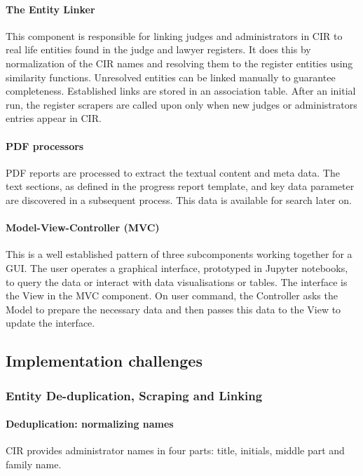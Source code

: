 \paragraph{The Entity Linker} This component is responsible for linking judges and administrators in CIR to real life entities found in the judge and lawyer registers. It does this by normalization of the CIR names and resolving them to the register entities using similarity functions. Unresolved entities can be linked manually to guarantee completeness. Established links are stored in an association table. After an initial run, the register scrapers are called upon only when new judges or administrators entries appear in CIR.

\paragraph{PDF processors}
PDF reports are processed to extract the textual content and meta data. The text sections, as defined in the progress report template, and key data parameter are discovered in a subsequent process. This data is available for search later on.

\paragraph{Model-View-Controller (MVC)}
This is a well established pattern of three subcomponents working together for a GUI. The user operates a graphical interface, prototyped in Jupyter notebooks, to query the data or interact with data visualisations or tables. The interface is the View in the MVC component. On user command, the Controller asks the Model to prepare the necessary data and then passes this data to the View to update the interface.


\subsection{Implementation challenges}
\subsubsection{Entity De-duplication, Scraping and Linking}
\paragraph{Deduplication: normalizing names}
CIR provides administrator names in four parts: title, initials, middle part and family name. 

